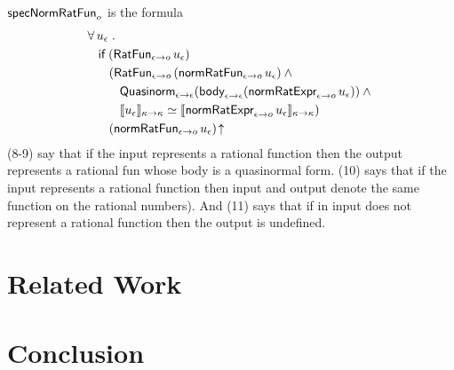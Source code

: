 \documentclass[fleqn]{llncs}
\begin{document}
$\mbox{\sf specNormRatFun}_o$ is the formula
\begin{align}
&
\forall\, u_\epsilon \mathrel.\\
& \hspace*{2ex}
\mbox{\sf if} \; (\mbox{\sf RatFun}_{\epsilon \rightarrow o} \, u_\epsilon)\\
& \hspace*{4ex}
(\mbox{\sf RatFun}_{\epsilon \rightarrow o} \, (\mbox{\sf normRatFun}_{\epsilon \rightarrow o} \, u_\epsilon) \wedge {}\\
& \hspace*{6ex}
\mbox{\sf Quasinorm}_{\epsilon \rightarrow \epsilon}(\mbox{\sf body}_{\epsilon \rightarrow \epsilon}(\mbox{\sf normRatExpr}_{\epsilon \rightarrow o} \, u_\epsilon)) \wedge {}\\
& \hspace*{6ex}
\llbracket u_\epsilon\rrbracket_{\kappa \rightarrow \kappa} \simeq
\llbracket\mbox{\sf normRatExpr}_{\epsilon \rightarrow o} \, u_\epsilon\rrbracket_{\kappa \rightarrow \kappa})\\
& \hspace*{4ex}
(\mbox{\sf normRatFun}_{\epsilon \rightarrow o} \, u_\epsilon)\!\uparrow
\end{align}
(8-9) say that if the input represents a rational function then the
output represents a rational fun whose body is a quasinormal form.
(10) says that if the input represents a rational function then input
and output denote the same function on the rational numbers).  And
(11) says that if in input does not represent a rational function then
the output is undefined.



\section{Related Work}

\section{Conclusion}




\setcounter{tocdepth}{1}
\listoftodos
\setcounter{tocdepth}{0}
\end{document}

